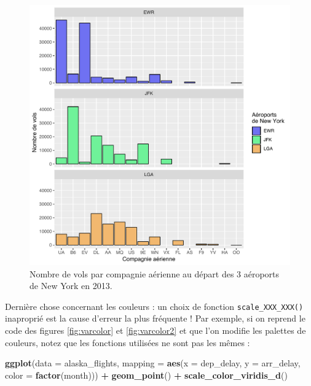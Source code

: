 \documentclass[a4paperpaper,]{article}
\newenvironment{Shaded}{\begin{snugshade}}{\end{snugshade}}
\newcommand{\KeywordTok}[1]{\textcolor[rgb]{0.13,0.29,0.53}{\textbf{#1}}}
\newcommand{\DataTypeTok}[1]{\textcolor[rgb]{0.13,0.29,0.53}{#1}}
\newcommand{\StringTok}[1]{\textcolor[rgb]{0.31,0.60,0.02}{#1}}
\newcommand{\OperatorTok}[1]{\textcolor[rgb]{0.81,0.36,0.00}{\textbf{#1}}}
\newcommand{\NormalTok}[1]{#1}
\theoremstyle{definition}
\theoremstyle{definition}
\theoremstyle{definition}
\theoremstyle{remark}
\begin{document}
\begin{figure}[htpb]

{\centering \includegraphics[width=0.9\linewidth]{figure/barfacethex-1} 

}

\caption{Nombre de vols par compagnie aérienne au départ des 3 aéroports de New York en 2013.}\label{fig:barfacethex}
\end{figure}

Dernière chose concernant les couleurs : un choix de fonction
\texttt{scale\_XXX\_XXX()} inaproprié est la cause d'erreur la plus
fréquente ! Par exemple, si on reprend le code des figures
\ref{fig:varcolor} et \ref{fig:varcolor2} et que l'on modifie les
palettes de couleurs, notez que les fonctions utilisées ne sont pas les
mêmes :

\begin{Shaded}
\begin{Highlighting}[]
\KeywordTok{ggplot}\NormalTok{(}\DataTypeTok{data =}\NormalTok{ alaska_flights, }\DataTypeTok{mapping =} \KeywordTok{aes}\NormalTok{(}\DataTypeTok{x =}\NormalTok{ dep_delay, }\DataTypeTok{y =}\NormalTok{ arr_delay, }\DataTypeTok{color =} \KeywordTok{factor}\NormalTok{(month))) }\OperatorTok{+}
\StringTok{  }\KeywordTok{geom_point}\NormalTok{() }\OperatorTok{+}
\StringTok{  }\KeywordTok{scale_color_viridis_d}\NormalTok{()}
\end{Highlighting}
\end{Shaded}
\end{document}

